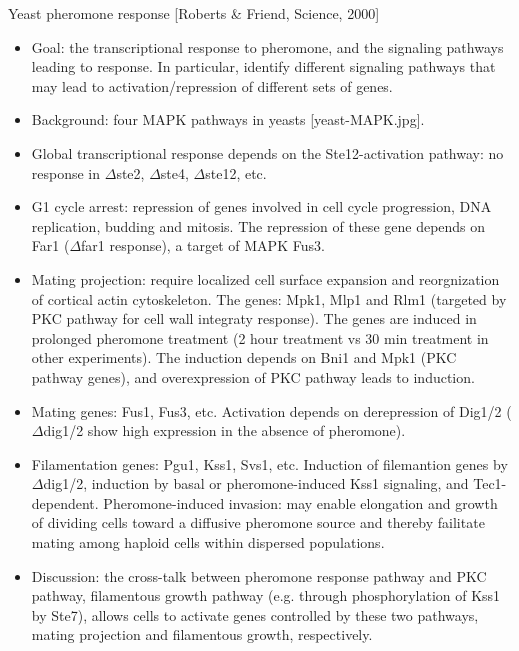 \documentclass{report}
\begin{document}
Yeast pheromone response [Roberts \& Friend, Science, 2000]
\begin{itemize}
	\item Goal: the transcriptional response to pheromone, and the signaling pathways leading to response. In particular, identify different signaling pathways that may lead to activation/repression of different sets of genes. 
	
	\item Background: four MAPK pathways in yeasts [yeast-MAPK.jpg]. 
	
	\item Global transcriptional response depends on the Ste12-activation pathway: no response in $\Delta$ste2, $\Delta$ste4, $\Delta$ste12, etc.  
	
	\item G1 cycle arrest: repression of genes involved in cell cycle progression, DNA replication, budding and mitosis. The repression of these gene depends on Far1 ($\Delta$far1 response), a target of MAPK Fus3. 
	
	\item Mating projection: require localized cell surface expansion and reorgnization of cortical actin cytoskeleton. The genes: Mpk1, Mlp1 and Rlm1 (targeted by PKC pathway for cell wall integraty response). The genes are induced in prolonged pheromone treatment (2 hour treatment vs 30 min treatment in other experiments). The induction depends on Bni1 and Mpk1 (PKC pathway genes), and overexpression of PKC pathway leads to induction. 
	
	\item Mating genes: Fus1, Fus3, etc. Activation depends on derepression of Dig1/2 ($\Delta$dig1/2 show high expression in the absence of pheromone). 
	
	\item Filamentation genes: Pgu1, Kss1, Svs1, etc. Induction of filemantion genes by $\Delta$dig1/2, induction by basal or pheromone-induced Kss1 signaling, and Tec1-dependent. Pheromone-induced invasion: may enable elongation and growth of dividing cells toward a diffusive pheromone source and thereby failitate mating among haploid cells within dispersed populations.  
	
	\item Discussion: the cross-talk between pheromone response pathway and PKC pathway, filamentous growth pathway (e.g. through phosphorylation of Kss1 by Ste7), allows cells to activate genes controlled by these two pathways, mating projection and filamentous growth, respectively. 
\end{itemize}
\end{document}
